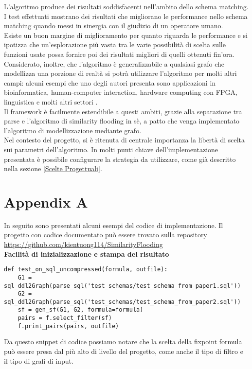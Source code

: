 \documentclass{article}
\begin{document}
L’algoritmo produce dei risultati soddisfacenti nell’ambito dello schema matching. I test effettuati mostrano dei risultati che migliorano le performance nello schema matching quando messi in sinergia con il giudizio di un operatore umano.\\

Esiste un buon margine di miglioramento per quanto riguarda le performance e si ipotizza che un'esplorazione più vasta tra le varie possibilità di scelta sulle funzioni usate possa fornire poi dei risultati migliori di quelli ottenuti fin'ora.\\

Considerato, inoltre, che l’algoritmo è generalizzabile a qualsiasi grafo che modellizza una porzione di realtà si potrà utilizzare l’algoritmo per molti altri campi: alcuni esempi che uno degli autori presenta sono applicazioni in bioinformatica, human-computer interaction, hardware computing con FPGA, linguistica e molti altri settori \cite{decade_after_flooding}.\\

Il framework è facilmente estendibile a questi ambiti, grazie alla separazione tra parse e l’algoritmo di similarity flooding in sè, a patto che venga implementato l’algoritmo di modellizzazione mediante grafo.\\

Nel contesto del progetto, si è ritenuta di centrale importanza la libertà di scelta sui parametri dell’algoritmo. In molti punti chiave dell’implementazione presentata è possibile configurare la strategia da utilizzare, come già descritto nella sezione \ref{Scelte Progettuali}.\\


\section*{Appendix A}

In seguito sono presentati alcuni esempi del codice di implementazione. Il progetto con codice documentato può essere trovato sulla repository \url{https://github.com/kientuong114/SimilarityFlooding}\\


\textbf{Facilità di inizializzazione e stampa del risultato}
\begin{verbatim}
def test_on_sql_uncompressed(formula, outfile):
    G1 = sql_ddl2Graph(parse_sql('test_schemas/test_schema_from_paper1.sql'))
    G2 = sql_ddl2Graph(parse_sql('test_schemas/test_schema_from_paper2.sql'))
    sf = gen_sf(G1, G2, formula=formula)
    pairs = f.select_filter(sf)
    f.print_pairs(pairs, outfile)
\end{verbatim}
Da questo snippet di codice possiamo notare che la scelta della fixpoint formula può essere presa dal più alto di livello del progetto, come anche il tipo di filtro e il tipo di grafi di input.\\
\end{document}
